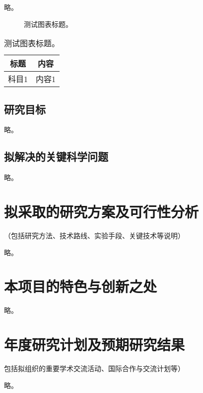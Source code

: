 \documentclass[subfig,boldtoc]{mynsfc}
\begin{document}
略。

\begin{figure}[h]
  \centering
  
  \caption{测试图表标题。}
  \label{fig:test}
\end{figure}

\begin{table}[h]
  \centering
  \begin{tabular}{cc}
    \hline
    标题 & 内容 \\
    \hline
    科目1 & 内容1 \\
    \hline
  \end{tabular}
  \caption{测试图表标题。}
  \label{tab:test}
\end{table}
\subsection{研究目标}

略。

\subsection{拟解决的关键科学问题}

略。

\section{拟采取的研究方案及可行性分析}
\label{sec:approach}

\begin{hcomment}
  （包括研究方法、技术路线、实验手段、关键技术等说明）
\end{hcomment}

略。

\section{本项目的特色与创新之处}
\label{sec:innovation}

略。

\section{年度研究计划及预期研究结果}
\label{sec:plan}

\begin{hcomment}
  包括拟组织的重要学术交流活动、国际合作与交流计划等）
\end{hcomment}

略。
\end{document}
